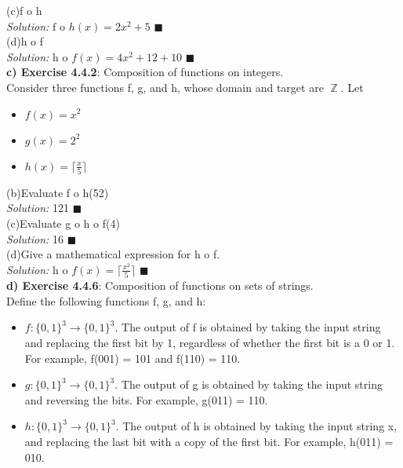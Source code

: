 \documentclass[11pt]{article}
\DeclareMathOperator*{\Z}{\mathbb{Z}}\relax
\begin{document}
		(c)f o h \\
		\textit{Solution: }
		$\text{f o }h(x) = 2x^2 + 5$ $\blacksquare$ \\
		
		(d)h o f \\ 
		\textit{Solution: }
		$\text{h o }f(x) = 4x^2+12+10$ $\blacksquare$ \\		
		
	\newpage
		\textbf{c) Exercise 4.4.2}: Composition of functions on integers. \\
		Consider three functions f, g, and h, whose domain and target are $\Z$. Let	
		\begin{itemize}
			\item $f(x) = x^2$
			\item $g(x) = 2^2$
			\item $h(x) = \lceil \frac{x}{5} \rceil$
		\end{itemize}
		
		(b)Evaluate f o h(52)	\\
		\textit{Solution: } 121 $\blacksquare$ \\
		
		
		(c)Evaluate g o h o f(4) \\
		\textit{Solution: } 16 $\blacksquare$ \\
		
		(d)Give a mathematical expression for h o f. \\
		\textit{Solution: }
		$\text{h o }f(x) = \lceil \frac{x^2}{5} \rceil$ $\blacksquare$ \\
		
		\textbf{d) Exercise 4.4.6}: Composition of functions on sets of strings. \\
		Define the following functions f, g, and h:
		\begin{itemize}
			\item $f: \{0, 1\}^3 \rightarrow \{0, 1\}^3$. The output of f is obtained by taking the input string and replacing the first bit by 1, 
			regardless of whether the first bit is a 0 or 1. For example, f(001) = 101 and f(110) = 110.
			\item $g: \{0, 1\}^3 \rightarrow \{0, 1\}^3$. The output of g is obtained by taking the input string and reversing the bits. For example, g(011) = 110.
			\item $h: \{0, 1\}^3 \rightarrow \{0, 1\}^3$. The output of h is obtained by taking the input string x, 
			and replacing the last bit with a copy of the first bit. For example, h(011) = 010.
		\end{itemize}		
		
\end{document}
